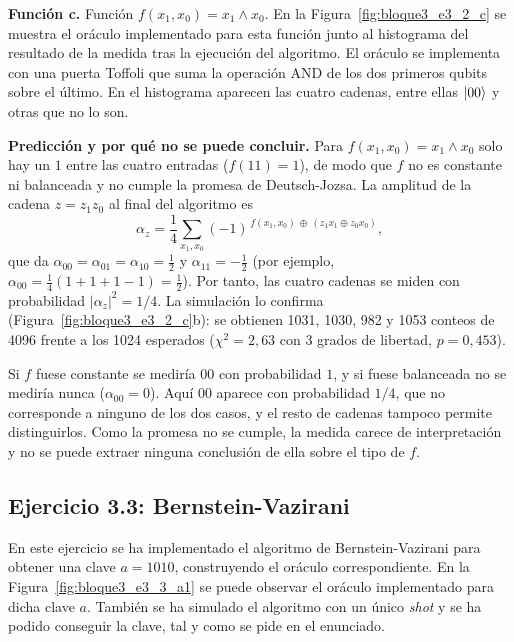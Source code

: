 \textbf{Función c.} Función $f(x_1, x_0) = x_1 \land x_0$. En la
Figura~\ref{fig:bloque3_e3_2_c} se muestra el oráculo implementado para
esta función junto al histograma del resultado de la medida tras la
ejecución del algoritmo. El oráculo se implementa con una puerta Toffoli
que suma la operación AND de los dos primeros qubits sobre el último. En
el histograma aparecen las cuatro cadenas, entre ellas $\ket{00}$ y otras
que no lo son.

\textbf{Predicción y por qué no se puede concluir.} Para
$f(x_1,x_0)=x_1\wedge x_0$ solo hay un $1$ entre las cuatro entradas
($f(11)=1$), de modo que $f$ no es constante ni balanceada y no cumple la
promesa de Deutsch-Jozsa. La amplitud de la cadena $z=z_1z_0$ al final
del algoritmo es
\[
  \alpha_z=\frac14\sum_{x_1,x_0}(-1)^{\,f(x_1,x_0)\,\oplus\,(z_1x_1\oplus z_0x_0)},
\]
que da $\alpha_{00}=\alpha_{01}=\alpha_{10}=\tfrac12$ y
$\alpha_{11}=-\tfrac12$ (por ejemplo,
$\alpha_{00}=\tfrac14(1+1+1-1)=\tfrac12$). Por tanto, las cuatro cadenas
se miden con probabilidad $|\alpha_z|^2=1/4$. La simulación lo confirma
(Figura~\ref{fig:bloque3_e3_2_c}b): se obtienen 1031, 1030, 982 y 1053
conteos de 4096 frente a los 1024 esperados ($\chi^2=2{,}63$ con
3 grados de libertad, $p=0{,}453$).

Si $f$ fuese constante se mediría $00$ con probabilidad $1$, y si fuese
balanceada no se mediría nunca ($\alpha_{00}=0$). Aquí $00$ aparece con
probabilidad $1/4$, que no corresponde a ninguno de los dos casos, y el
resto de cadenas tampoco permite distinguirlos. Como la promesa no se
cumple, la medida carece de interpretación y no se puede extraer ninguna
conclusión de ella sobre el tipo de $f$.

\subsection{Ejercicio 3.3: Bernstein-Vazirani}\label{subsection:ejercicio3_3}
En este ejercicio se ha implementado el algoritmo de Bernstein-Vazirani para obtener una clave $a = 1010$, construyendo el oráculo
correspondiente. En la Figura~\ref{fig:bloque3_e3_3_a1} se puede observar el oráculo implementado para dicha clave $a$. También se ha simulado
el algoritmo con un único \textit{shot} y se ha podido conseguir la clave, tal y como se pide en el enunciado.

